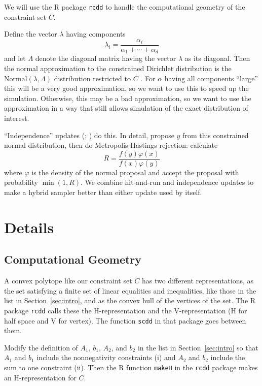 \documentclass[11pt]{article}
\begin{document}
We will use the R package \texttt{rcdd} \citep*{rcdd} to handle
the computational geometry of the constraint set $C$.

Define the vector $\lambda$ having components
\begin{equation} \label{eq:lambda}
   \lambda_i = \frac{\alpha_i}{\alpha_1 + \cdots + \alpha_d}
\end{equation}
and let $\Lambda$ denote the diagonal matrix having the vector $\lambda$
as its diagonal.  Then the normal approximation to the constrained
Dirichlet distribution is
the $\text{Normal}(\lambda, \Lambda)$ distribution
restricted to $C$ \citep[Theorem~4.2]{geyer-meeden}.  For $\alpha$ having
all components ``large'' this will be a very good approximation, so we want
to use this to speed up the simulation.  Otherwise, this may be a bad
approximation, so we want to use the approximation in a way that still
allows simulation of the exact distribution of interest.

``Independence'' updates (\citealp{hastings};
\citealp[Section~2.3.3]{tierney}) do this.
In detail, propose $y$ from this constrained normal distribution,
then do Metropolis-Hastings rejection: calculate
$$
    R = \frac{f(y) \varphi(x)}{f(x) \varphi(y)}
$$
where $\varphi$ is the density of the normal proposal and accept the
proposal with probability $\min(1, R)$.
We combine hit-and-run and independence updates to make a hybrid sampler
\citep[Section~2.4]{tierney} better than either update used by itself.

\section{Details}

\subsection{Computational Geometry}

A convex polytope like our constraint set $C$ has two different
representations, as the set satisfying a finite set of linear equalities
and inequalities, like those in the list in Section~\ref{sec:intro},
and as the convex hull
of the vertices of the set.   The R package \texttt{rcdd} calls these
the H-representation and the V-representation
(H for half space and V for vertex).  The function
\texttt{scdd} in that package goes between them.

Modify the definition of $A_1$, $b_1$, $A_2$, and $b_2$ in the list in
Section~\ref{sec:intro}
so that $A_1$ and $b_1$ include the nonnegativity constraints (i) and
$A_2$ and $b_2$ include the sum to one constraint (ii).  Then the
R function \texttt{makeH} in the \texttt{rcdd} package makes
an H-representation for $C$.
\end{document}
